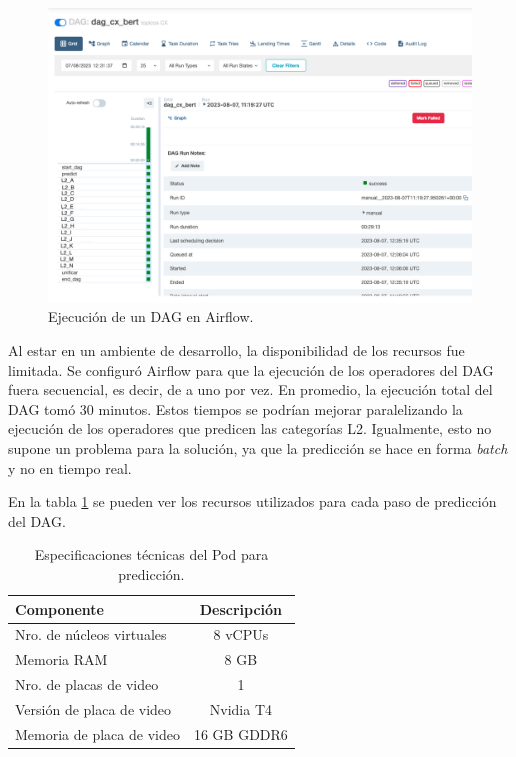 \begin{figure}[H]
	\centering
	\includegraphics[width=1\textwidth]{./Figures/cap4-dag.png}
	\caption{Ejecución de un DAG en Airflow.}
	\label{fig:cap4-dag}
\end{figure}

Al estar en un ambiente de desarrollo, la disponibilidad de los recursos fue limitada. Se configuró Airflow para que la ejecución de los operadores del DAG fuera secuencial, es decir, de a uno por vez. En promedio, la ejecución total del DAG tomó 30 minutos. Estos tiempos se podrían mejorar paralelizando la ejecución de los operadores que predicen las categorías L2. Igualmente, esto no supone un problema para la solución, ya que la predicción se hace en forma \textit{batch} y no en tiempo real.

En la tabla \ref{tab:gke} se pueden ver los recursos utilizados para cada paso de predicción del DAG.
\begin{table}[H]
	\centering
	\caption[Especificaciones técnicas Pod]{Especificaciones técnicas del Pod para predicción.}
	\begin{tabular}{l c}    
		\toprule
		\textbf{Componente}			& 			\textbf{Descripción}  \\
		\midrule	
		Nro. de núcleos virtuales	& 			8 vCPUs  \\
		Memoria RAM					&			8 GB \\
		Nro. de placas de video 	& 			1  \\
		Versión de placa de video	&			Nvidia T4 \\
		Memoria de placa de video	& 			16 GB GDDR6  \\
		\bottomrule
		\hline
	\end{tabular}
	\label{tab:gke}
\end{table}

